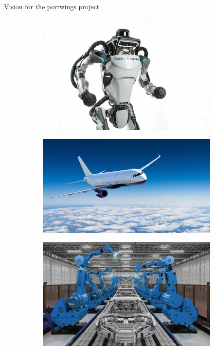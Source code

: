 \documentclass[aspectratio=169]{beamer}
\begin{document}
\begin{frame}{Vision for the portwings project}
\begin{figure}[t]
	\begin{subfigure}[t]{0.3\textwidth}
		\includegraphics[width=\columnwidth]{robotics.jpg}\\
	\end{subfigure}\hfill
	\begin{subfigure}[t]{0.3\textwidth}
		\includegraphics[width=\columnwidth]{aerospace.jpg}\\
	\end{subfigure}\hfill
	\begin{subfigure}[t]{0.3\textwidth}
		\includegraphics[width=\columnwidth]{manufacturing.jpg}\\
	\end{subfigure}
\end{figure}


\end{frame}
\end{document}
